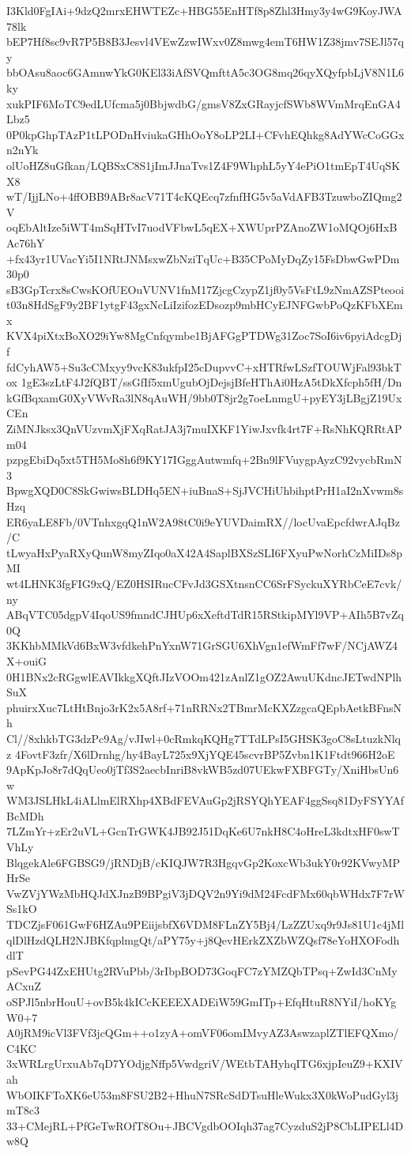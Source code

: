 I3Kld0FgIAi+9dzQ2mrxEHWTEZc+HBG55EnHTf8p8Zhl3Hmy3y4wG9KoyJWA78lk
bEP7Hf8sc9vR7P5B8B3Jesvl4VEwZzwIWxv0Z8mwg4emT6HW1Z38jmv7SEJl57qy
bbOAsu8aoc6GAmnwYkG0KEl33iAfSVQmfttA5c3OG8mq26qyXQyfpbLjV8N1L6ky
xukPIF6MoTC9edLUfcma5j0BbjwdbG/gmsV8ZxGRayjcfSWb8WVmMrqEnGA4Lbz5
0P0kpGhpTAzP1tLPODnHviukaGHhOoY8oLP2LI+CFvhEQhkg8AdYWcCoGGxn2nYk
olUoHZ8uGfkan/LQBSxC8S1jImJJnaTvs1Z4F9WhphL5yY4ePiO1tmEpT4UqSKX8
wT/IjjLNo+4ffOBB9ABr8acV71T4cKQEcq7zfnfHG5v5aVdAFB3TzuwboZIQmg2V
oqEbAltIze5iWT4mSqHTvI7uodVFbwL5qEX+XWUprPZAnoZW1oMQOj6HxBAc76hY
+fx43yr1UVacYi5I1NRtJNMsxwZbNziTqUc+B35CPoMyDqZy15FsDbwGwPDm30p0
sB3GpTcrx8sCwsKOfUEOuVUNV1fnM17ZjcgCzypZ1jf0y5VsFtL9zNmAZSPteooi
t03n8HdSgF9y2BF1ytgF43gxNcLiIzifozEDsozp9mbHCyEJNFGwbPoQzKFbXEmx
KVX4piXtxBoXO29iYw8MgCnfqymbe1BjAFGgPTDWg31Zoc7SoI6iv6pyiAdcgDjf
fdCyhAW5+Su3cCMxyy9vcK83ukfpI25cDupvvC+xHTRfwLSzfTOUWjFal93bkTox
1gE3szLtF4J2fQBT/ssGfIf5xmUgubOjDejsjBfeHThAi0HzA5tDkXfcph5fH/Dn
kGfBqxamG0XyVWvRa3lN8qAuWH/9bb0T8jr2g7oeLnmgU+pyEY3jLBgjZ19UxCEn
ZiMNJksx3QnVUzvmXjFXqRatJA3j7muIXKF1YiwJxvfk4rt7F+RsNhKQRRtAPm04
pzpgEbiDq5xt5TH5Mo8h6f9KY17IGggAutwmfq+2Bn9lFVuygpAyzC92vycbRmN3
BpwgXQD0C8SkGwiwsBLDHq5EN+iuBnaS+SjJVCHiUhbihptPrH1aI2nXvwm8sHzq
ER6yaLE8Fb/0VTnhxgqQ1nW2A98tC0i9eYUVDaimRX//locUvaEpcfdwrAJqBz/C
tLwyaHxPyaRXyQunW8myZIqo0aX42A4SaplBXSzSLI6FXyuPwNorhCzMiIDs8pMI
wt4LHNK3fgFIG9xQ/EZ0HSIRucCFvJd3GSXtnsnCC6SrFSyckuXYRbCeE7cvk/ny
ABqVTC05dgpV4IqoUS9fmndCJHUp6xXeftdTdR15RStkipMYl9VP+AIh5B7vZq0Q
3KKhbMMkVd6BxW3vfdkehPnYxnW71GrSGU6XhVgn1efWmFf7wF/NCjAWZ4X+ouiG
0H1BNx2cRGgwlEAVIkkgXQftJIzVOOm421zAnlZ1gOZ2AwuUKdncJETwdNPlhSuX
phuirxXuc7LtHtBnjo3rK2x5A8rf+71nRRNx2TBmrMcKXZzgcaQEpbAetkBFnsNh
Cl//8xhkbTG3dzPc9Ag/vJIwl+0cRmkqKQHg7TTdLPsI5GHSK3goC8sLtuzkNlqz
4FovtF3zfr/X6lDrnhg/hy4BayL725x9XjYQE45scvrBP5Zvbn1K1Ftdt966H2oE
9ApKpJo8r7dQqUeo0jTf3S2aecbInriB8vkWB5zd07UEkwFXBFGTy/XniHbsUn6w
WM3JSLHkL4iALlmElRXhp4XBdFEVAuGp2jRSYQhYEAF4ggSsq81DyFSYYAfBcMDh
7LZmYr+zEr2uVL+GcnTrGWK4JB92J51DqKe6U7nkH8C4oHreL3kdtxHF0swTVhLy
BlqgekAle6FGBSG9/jRNDjB/cKIQJW7R3HgqvGp2KoxcWb3ukY0r92KVwyMPHrSe
VwZVjYWzMbHQJdXJnzB9BPgiV3jDQV2n9Yi9dM24FcdFMx60qbWHdx7F7rWSs1kO
TDCZjsF061GwF6HZAu9PEiijsbfX6VDM8FLnZY5Bj4/LzZZUxq9r9Js81U1c4jMl
qlDlHzdQLH2NJBKfqplmgQt/aPY75y+j8QevHErkZXZbWZQsf78eYoHXOFodhdlT
pSevPG44ZxEHUtg2RVuPbb/3rIbpBOD73GoqFC7zYMZQbTPsq+ZwId3CnMyACxuZ
oSPJl5nbrHouU+ovB5k4kICcKEEEXADEiW59GmITp+EfqHtuR8NYiI/hoKYgW0+7
A0jRM9icVl3FVf3jcQGm++o1zyA+omVF06omIMvyAZ3AswzaplZTlEFQXmo/C4KC
3xWRLrgUrxuAb7qD7YOdjgNffp5VwdgriV/WEtbTAHyhqITG6xjpIeuZ9+KXIVah
WbOIKFToXK6eU53m8FSU2B2+HhuN7SRcSdDTsuHleWukx3X0kWoPudGyl3jmT8c3
33+CMejRL+PfGeTwROfT8Ou+JBCVgdbOOIqh37ag7CyzduS2jP8CbLIPELl4Dw8Q
